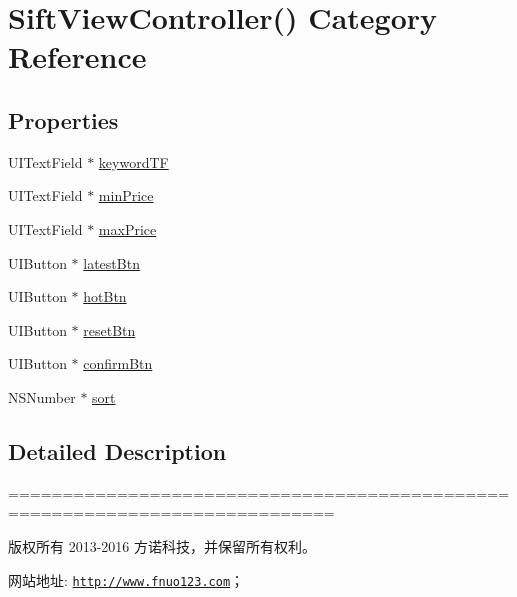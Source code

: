 \hypertarget{category_sift_view_controller_07_08}{}\section{Sift\+View\+Controller() Category Reference}
\label{category_sift_view_controller_07_08}
\subsection*{Properties}
\begin{DoxyCompactItemize}
\item 
U\+I\+Text\+Field $\ast$ \mbox{\hyperlink{category_sift_view_controller_07_08_a9bcef06429b4ed10283c65e92a85b833}{keyword\+TF}}
\item 
U\+I\+Text\+Field $\ast$ \mbox{\hyperlink{category_sift_view_controller_07_08_ad08fc23378fcc47aa388d3417ef7e0b1}{min\+Price}}
\item 
U\+I\+Text\+Field $\ast$ \mbox{\hyperlink{category_sift_view_controller_07_08_ac4f4ad2a6c063a5dc265536e66705205}{max\+Price}}
\item 
U\+I\+Button $\ast$ \mbox{\hyperlink{category_sift_view_controller_07_08_a1df1a5122f70be247a353dd548536e85}{latest\+Btn}}
\item 
U\+I\+Button $\ast$ \mbox{\hyperlink{category_sift_view_controller_07_08_aeb8af756f1803e97533e2f1bd96bf302}{hot\+Btn}}
\item 
U\+I\+Button $\ast$ \mbox{\hyperlink{category_sift_view_controller_07_08_aae3bbe3b5499a1a1b93f4fc3b876fb2a}{reset\+Btn}}
\item 
U\+I\+Button $\ast$ \mbox{\hyperlink{category_sift_view_controller_07_08_abd0c78634799410244444ceb8e52a736}{confirm\+Btn}}
\item 
N\+S\+Number $\ast$ \mbox{\hyperlink{category_sift_view_controller_07_08_abe6bca432adb0dd6ea19b1196b1e7b70}{sort}}
\end{DoxyCompactItemize}


\subsection{Detailed Description}
============================================================================

版权所有 2013-\/2016 方诺科技，并保留所有权利。

网站地址\+: \href{http://www.fnuo123.com}{\tt http\+://www.\+fnuo123.\+com}； 




